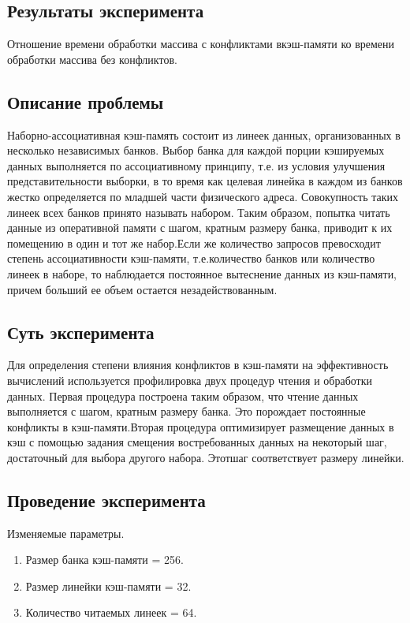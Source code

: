 \subsection{Результаты эксперимента}
Отношение времени обработки массива с конфликтами вкэш-памяти ко времени обработки массива без конфликтов.


\subsection{Описание проблемы}
Наборно-ассоциативная кэш-память состоит из линеек данных, организованных в несколько независимых банков. Выбор банка для каждой порции кэшируемых данных выполняется по ассоциативному принципу, т.е. из условия улучшения представительности выборки, в то время как целевая линейка в каждом из банков жестко определяется по младшей части физического адреса. Совокупность таких линеек всех банков принято называть набором. Таким образом, попытка читать данные из оперативной памяти с шагом, кратным размеру банка, приводит к их помещению в один и тот же набор.Если же количество запросов превосходит степень ассоциативности кэш-памяти, т.е.количество банков или количество линеек в наборе, то наблюдается постоянное вытеснение данных из кэш-памяти, причем больший ее объем  остается незадействованным.

\subsection{Суть эксперимента}  
Для определения степени влияния конфликтов в кэш-памяти на эффективность вычислений используется профилировка двух процедур чтения и обработки данных. Первая процедура построена таким образом, что чтение данных выполняется с шагом, кратным размеру банка. Это порождает постоянные конфликты в кэш-памяти.Вторая процедура оптимизирует размещение данных в кэш с помощью задания смещения востребованных данных на некоторый шаг, достаточный для выбора другого набора. Этотшаг соответствует размеру линейки.  


\subsection{Проведение эксперимента}

Изменяемые параметры.

\begin{enumerate}
	\item Размер банка кэш-памяти = 256.
	\item Размер линейки кэш-памяти = 32.
	\item Количество читаемых линеек = 64.
\end{enumerate}

